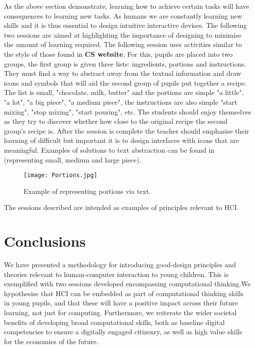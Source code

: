 \documentclass{sig-alternate}
\begin{document}
As the above section demonstrate, learning how to achieve certain tasks will have consequences to learning new tasks. As humans we are constantly learning new skills and it is thus essential to design intuitive interactive devises. The following two sessions are aimed at highlighting the importance of designing to minimise the amount of learning required. The following session uses activities similar to the style of those found in \textbf{CS website}.
For this, pupils are placed into two groups, the first group is given three lists: ingredients, portions and instructions. They must find a way to abstract away from the textual information and draw icons and symbols that will aid the second group of pupils put together a recipe. The list is small, "chocolate, milk, butter" and the portions are simple "a little", "a lot", "a big piece", "a medium piece", the instructions are also simple "start mixing", "stop mixing", "start pouring", etc. The students should enjoy themselves as they try to discover whether how close to the original recipe the second group's recipe is. After the session is complete the teacher should emphasise their learning of difficult but important it is to design interfaces with icons that are meaningful. Examples of solutions to text abstraction can be found in \cite{fig1} (representing small, medium and large piece).


\begin{figure}
  \texttt{[image: Portions.jpg]}
  \caption{Example of representing portions via text.}\label{fig1}
\end{figure}

The sessions described are intended as examples of principles relevant to HCI  


\section{Conclusions}
We have presented a methodology for introducing good-design principles and theories relevant to human-computer interaction to young children. This is exemplified with two sessions developed encompassing computational thinking.We hypothesise that HCI can be embedded as part of computational thinking skills in young pupils, and that these will have a positive impact across their future learning, not just for computing. Furthermore, we reiterate the wider societal benefits of developing broad computational skills, both as baseline digital competencies to ensure a digitally engaged citizenry, as well as high value skills for the economies of the future.
\end{document}
